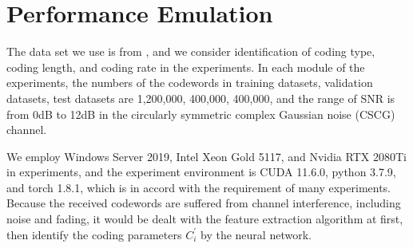 \documentclass[conference]{IEEEtran}
\begin{document}
\section{Performance Emulation}
The data set we use is from \cite{shen2021blind}, and we consider identification of coding type, coding length, and coding rate in the experiments. In each module of the experiments, the numbers of the codewords in training datasets, validation datasets, test datasets are 1,200,000, 400,000, 400,000, and the range of SNR is from 0dB to 12dB in the circularly symmetric complex Gaussian noise (CSCG) channel.

We employ Windows Server 2019, Intel Xeon Gold 5117, and Nvidia RTX 2080Ti in experiments, and the experiment environment is CUDA 11.6.0, python 3.7.9, and torch 1.8.1, which is in accord with the requirement of many experiments. Because the received codewords are suffered from channel interference, including noise and fading, it would be dealt with the feature extraction algorithm at first, then identify the coding parameters $C_i^{\prime}$ by the neural network.
\end{document}
